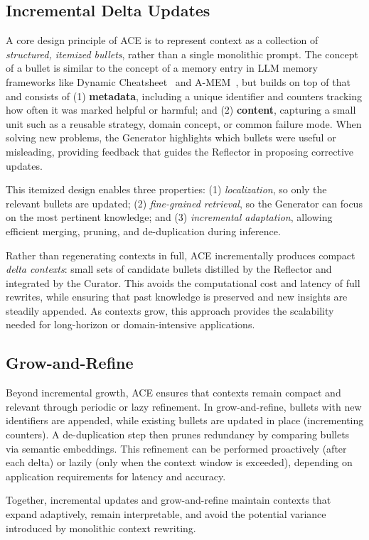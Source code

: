 \subsection{Incremental Delta Updates}
\label{subsec:delta-update}

A core design principle of ACE is to represent context as a collection of \emph{structured, itemized bullets}, rather than a single monolithic prompt. 
The concept of a bullet is similar to the concept of a memory entry in LLM memory frameworks like Dynamic Cheatsheet~\citep{suzgun2025dynamic} and A-MEM~\citep{xu2025mem}, but builds on top of that and consists of (1) \textbf{metadata}, including a unique identifier and counters tracking how often it was marked helpful or harmful; and (2) \textbf{content}, capturing a small unit such as a reusable strategy, domain concept, or common failure mode. 
When solving new problems, the Generator highlights which bullets were useful or misleading, providing feedback that guides the Reflector in proposing corrective updates. 

This itemized design enables three properties: 
(1) \emph{localization}, so only the relevant bullets are updated; 
(2) \emph{fine-grained retrieval}, so the Generator can focus on the most pertinent knowledge; and 
(3) \emph{incremental adaptation}, allowing efficient merging, pruning, and de-duplication during inference.

Rather than regenerating contexts in full, ACE incrementally produces compact \emph{delta contexts}: small sets of candidate bullets distilled by the Reflector and integrated by the Curator. 
This avoids the computational cost and latency of full rewrites, while ensuring that past knowledge is preserved and new insights are steadily appended. 
As contexts grow, this approach provides the scalability needed for long-horizon or domain-intensive applications.

\subsection{Grow-and-Refine}
\label{subsec:grow-and-refine}

Beyond incremental growth, ACE ensures that contexts remain compact and relevant through periodic or lazy refinement. 
In grow-and-refine, bullets with new identifiers are appended, while existing bullets are updated in place (\eg incrementing counters). 
A de-duplication step then prunes redundancy by comparing bullets via semantic embeddings. 
This refinement can be performed proactively (after each delta) or lazily (only when the context window is exceeded), depending on application requirements for latency and accuracy.

Together, incremental updates and grow-and-refine maintain contexts that expand adaptively, remain interpretable, and avoid the potential variance introduced by monolithic context rewriting.